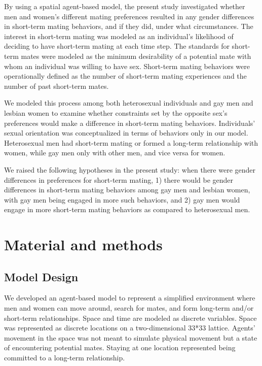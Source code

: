 \documentclass[
  11pt,
]{article}
\begin{document}
By using a spatial agent-based model, the present study investigated
whether men and women's different mating preferences resulted in any
gender differences in short-term mating behaviors, and if they did,
under what circumstances. The interest in short-term mating was modeled
as an individual's likelihood of deciding to have short-term mating at
each time step. The standards for short-term mates were modeled as the
minimum desirability of a potential mate with whom an individual was
willing to have sex. Short-term mating behaviors were operationally
defined as the number of short-term mating experiences and the number of
past short-term mates.

We modeled this process among both heterosexual individuals and gay men
and lesbian women to examine whether constraints set by the opposite
sex's preferences would make a difference in short-term mating
behaviors. Individuals' sexual orientation was conceptualized in terms
of behaviors only in our model. Heterosexual men had short-term mating
or formed a long-term relationship with women, while gay men only with
other men, and vice versa for women.

We raised the following hypotheses in the present study: when there were
gender differences in preferences for short-term mating, 1) there would
be gender differences in short-term mating behaviors among gay men and
lesbian women, with gay men being engaged in more such behaviors, and 2)
gay men would engage in more short-term mating behaviors as compared to
heterosexual men.

\hypertarget{material-and-methods}{%
\section{Material and methods}\label{material-and-methods}}

\hypertarget{model-design}{%
\subsection{Model Design}\label{model-design}}

We developed an agent-based model to represent a simplified environment
where men and women can move around, search for mates, and form
long-term and/or short-term relationships. Space and time are modeled as
discrete variables. Space was represented as discrete locations on a
two-dimensional 33*33 lattice. Agents' movement in the space was not
meant to simulate physical movement but a state of encountering
potential mates. Staying at one location represented being committed to
a long-term relationship.
\end{document}
